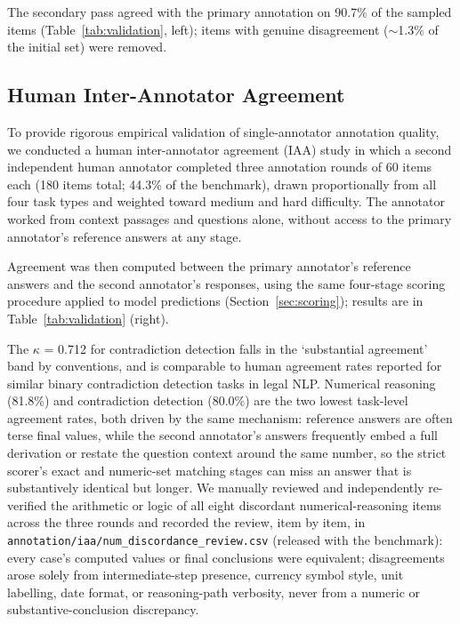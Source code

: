 The secondary pass agreed with the primary annotation on 90.7\% of the sampled items
(Table~\ref{tab:validation}, left); items with genuine disagreement ($\sim$1.3\% of the initial set)
were removed.

\subsection{Human Inter-Annotator Agreement}
\label{sec:iaa}

To provide rigorous empirical validation of single-annotator annotation quality, we conducted a
human inter-annotator agreement (IAA) study in which a second independent human annotator completed
three annotation rounds of 60 items each (180 items total; 44.3\% of the benchmark), drawn
proportionally from all four task types and weighted toward medium and hard difficulty. The
annotator worked from context passages and questions alone, without access to the primary
annotator's reference answers at any stage.

Agreement was then computed between the primary annotator's reference answers and the second
annotator's responses, using the same four-stage scoring procedure applied to model predictions
(Section~\ref{sec:scoring}); results are in Table~\ref{tab:validation} (right).

The $\kappa$ = 0.712 for contradiction detection falls in the `substantial agreement' band by
\citet{landiskoch1977} conventions, and is comparable to human agreement rates reported for similar
binary contradiction detection tasks in legal NLP. Numerical reasoning (81.8\%) and contradiction
detection (80.0\%) are the two lowest task-level agreement rates, both driven by the same mechanism:
reference answers are often terse final values, while the second annotator's answers frequently embed
a full derivation or restate the question context around the same number, so the strict scorer's
exact and numeric-set matching stages can miss an answer that is substantively identical but longer.
We manually reviewed and independently re-verified the arithmetic or logic of all eight discordant
numerical-reasoning items across the three rounds and recorded the review, item by item, in
\texttt{annotation/iaa/num\_discordance\_review.csv} (released with the benchmark): every case's
computed values or final conclusions were equivalent; disagreements arose solely from intermediate-step
presence, currency symbol style, unit labelling, date format, or reasoning-path verbosity, never from a
numeric or substantive-conclusion discrepancy.

